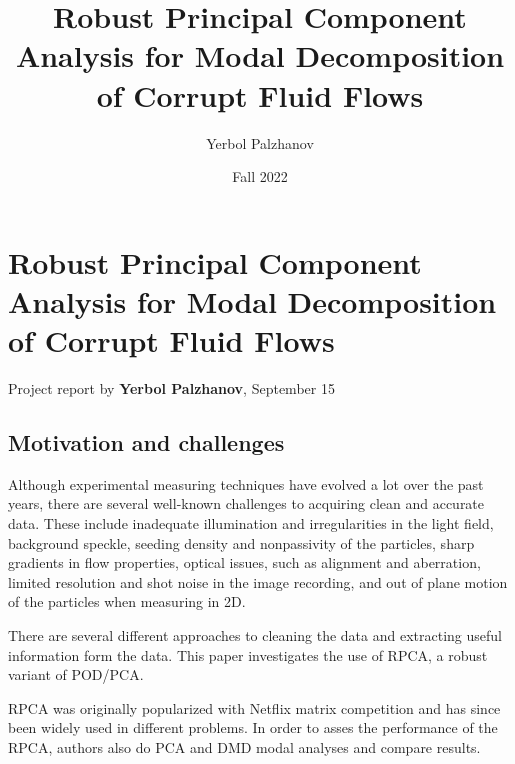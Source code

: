 \documentclass[12pt,letterpaper]{report}
\title{Robust Principal Component Analysis for Modal Decomposition of Corrupt Fluid Flows}
\author{Yerbol Palzhanov}
\date{Fall 2022}
\begin{document}
\section*{Robust Principal Component Analysis for Modal Decomposition of Corrupt Fluid Flows\cite{scherl2020}}{Project report by \textbf{Yerbol Palzhanov}, September 15}


%
%

\subsection*{Motivation and challenges}
Although experimental measuring techniques have evolved a lot over the past years, there are several well-known challenges to acquiring clean and accurate data. These include inadequate illumination and irregularities in the light
field, background speckle, seeding density and nonpassivity of the particles, sharp gradients in flow properties, optical issues, such as alignment and aberration, limited resolution and shot noise in the image recording, and out of plane motion of the particles when measuring in 2D.

There are several different approaches to cleaning the data and extracting useful information form the data. This paper investigates the use of RPCA, a robust variant of POD/PCA. 

RPCA was originally popularized with Netflix matrix competition and has since been widely used in different problems. In order to asses the performance of the RPCA, authors also do PCA and DMD modal analyses and compare results. 
\end{document}
